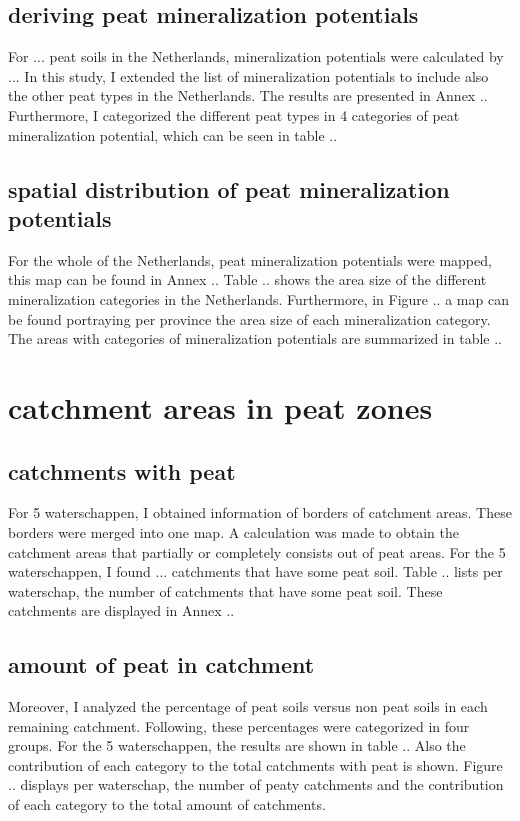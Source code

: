 \documentclass[a4paper,12pt]{scrbook}
\begin{document}
\subsection{deriving peat mineralization potentials}
For ... peat soils in the Netherlands, mineralization potentials were calculated by ...  In this study, I extended the list of mineralization potentials to include also the other peat types in the Netherlands. The results are presented in Annex .. Furthermore, I categorized the different peat types in 4 categories of peat mineralization potential, which can be seen in table ..

\subsection{spatial distribution of peat mineralization potentials}
For the whole of the Netherlands, peat mineralization potentials were mapped, this map can be found in Annex .. Table .. shows the area size of the different mineralization categories in the Netherlands. Furthermore, in Figure .. a map can be found portraying per province the area size of each mineralization category. The areas with categories of mineralization potentials are summarized in table ..

\section{catchment areas in peat zones}

\subsection{catchments with peat}
For 5 waterschappen, I obtained information of borders of catchment areas. These borders were merged into one map. A calculation was made to obtain the catchment areas that partially or completely consists out of peat areas. For the 5 waterschappen, I found ... catchments that have some peat soil. Table .. lists per waterschap, the number of catchments that have some peat soil. These catchments are displayed in Annex .. 

\subsection{amount of peat in catchment}
Moreover, I analyzed the percentage of peat soils versus non peat soils in each remaining catchment. Following, these percentages were categorized in four groups. For the 5 waterschappen, the results are shown in table .. Also the contribution of each category to the total catchments with peat is shown. Figure .. displays per waterschap, the number of peaty catchments and the contribution of each category to the total amount of catchments. 
\end{document}

